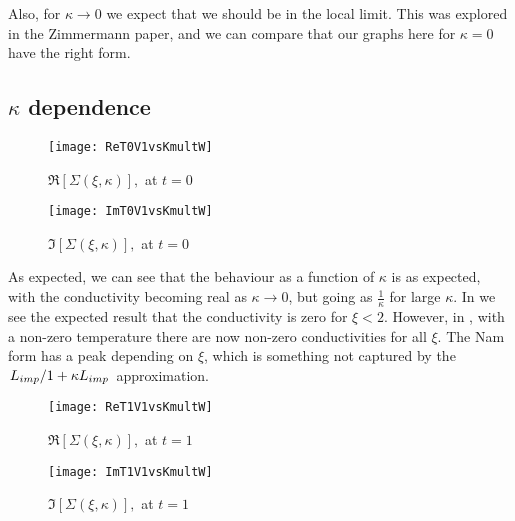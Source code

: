\documentclass[11pt]{article}
\begin{document}
Also, for $\kappa \rightarrow 0$ we expect that we should be in the local limit.
This was explored in the Zimmermann paper\supercite{Zimmermann1991}, and we can compare that our graphs here for $\kappa = 0$ have the right form. 

\subsection{$\kappa$ dependence} \label{subsec:NamForm.Graph.KDep}
\begin{figure}[htp]
	\centering
	\texttt{[image: ReT0V1vsKmultW]}
	\caption{$\Re[\Sigma(\xi, \kappa)],$ at $t = 0$} \label{fig:ReT0V1vsKmultW}
\end{figure}
\begin{figure}[htp]
	\centering
	\texttt{[image: ImT0V1vsKmultW]}
	\caption{$\Im[\Sigma(\xi, \kappa)],$ at $t = 0$} \label{fig:ImT0V1vsKmultW}
\end{figure}

As expected, we can see that the behaviour as a function of $\kappa$ is as expected, with the conductivity becoming real as $\kappa \rightarrow 0$, but going as $\frac{1}{\kappa}$ for large $\kappa$.
In  we see the expected result that the conductivity is zero for $\xi < 2$.
However, in , with a non-zero temperature there are now non-zero conductivities for all $\xi$.
The Nam form has a peak depending on $\xi$, which is something not captured by the $\flatfrac{L_{imp}}{1 + \kappa L_{imp}}$ approximation.
\begin{figure}[htp]
	\centering
	\texttt{[image: ReT1V1vsKmultW]}
	\caption{$\Re[\Sigma(\xi, \kappa)],$ at $t = 1$} \label{fig:ReT1V1vsKmultW}
\end{figure}
\begin{figure}[htp]
	\centering
	\texttt{[image: ImT1V1vsKmultW]}
	\caption{$\Im[\Sigma(\xi, \kappa)],$ at $t = 1$} \label{fig:ImT1V1vsKmultW}
\end{figure}

\end{document}
